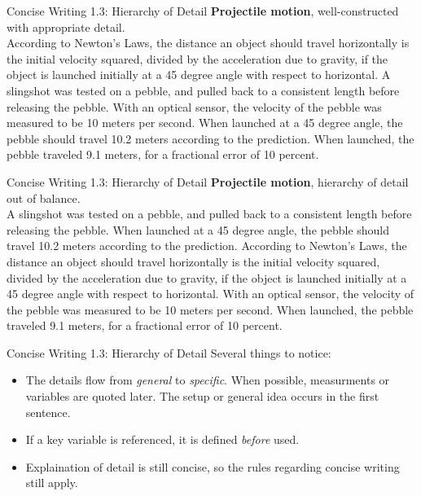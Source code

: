 \documentclass{beamer}
\begin{document}
\begin{frame}{Concise Writing 1.3: Hierarchy of Detail}
\textbf{Projectile motion}, well-constructed with appropriate detail. \\ \vspace{0.2cm}
According to Newton's Laws, the distance an object should travel horizontally is the initial velocity squared, divided by the acceleration due to gravity, if the object is launched initially at a 45 degree angle with respect to horizontal.  A slingshot was tested on a pebble, and pulled back to a consistent length before releasing the pebble.  With an optical sensor, the velocity of the pebble was measured to be 10 meters per second.  When launched at a 45 degree angle, the pebble should travel 10.2 meters according to the prediction.  When launched, the pebble traveled 9.1 meters, for a fractional error of 10 percent.
\end{frame}

\begin{frame}{Concise Writing 1.3: Hierarchy of Detail}
\textbf{Projectile motion}, hierarchy of detail out of balance. \\ \vspace{0.2cm}
A slingshot was tested on a pebble, and pulled back to a consistent length before releasing the pebble.  When launched at a 45 degree angle, the pebble should travel 10.2 meters according to the prediction.  According to Newton's Laws, the distance an object should travel horizontally is the initial velocity squared, divided by the acceleration due to gravity, if the object is launched initially at a 45 degree angle with respect to horizontal.  With an optical sensor, the velocity of the pebble was measured to be 10 meters per second.  When launched, the pebble traveled 9.1 meters, for a fractional error of 10 percent.
\end{frame}

\begin{frame}{Concise Writing 1.3: Hierarchy of Detail}
Several things to notice:
\begin{itemize}
\item The details flow from \textit{general} to \textit{specific}.  When possible, measurments or variables are quoted later.  The setup or general idea occurs in the first sentence.
\item If a key variable is referenced, it is defined \textit{before} used.
\item Explaination of detail is still concise, so the rules regarding concise writing still apply.
\end{itemize}
\end{frame}
\end{document}
